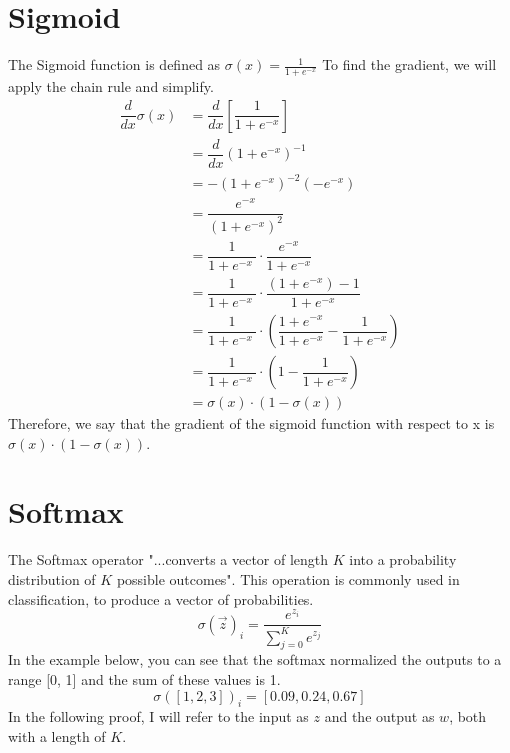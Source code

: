 \documentclass{report}
\begin{document}
        \section{Sigmoid}
            The Sigmoid function is defined as $\sigma(x) = \frac{1}{1+e^{-x}}$ To find the gradient, we will apply the chain rule and simplify.
            \begin{align}
                \dfrac{d}{dx} \sigma(x) &= \dfrac{d}{dx} \left[ \dfrac{1}{1 + e^{-x}} \right]\\
                &= \dfrac{d}{dx} \left( 1 + \mathrm{e}^{-x} \right)^{-1} \\
                &= -(1 + e^{-x})^{-2}(-e^{-x}) \\
                &= \dfrac{e^{-x}}{\left(1 + e^{-x}\right)^2} \\
                &= \dfrac{1}{1 + e^{-x}\ } \cdot \dfrac{e^{-x}}{1 + e^{-x}}  \\
                &= \dfrac{1}{1 + e^{-x}\ } \cdot \dfrac{(1 + e^{-x}) - 1}{1 + e^{-x}}  \\
                &= \dfrac{1}{1 + e^{-x}\ } \cdot \left( \dfrac{1 + e^{-x}}{1 + e^{-x}} - \dfrac{1}{1 + e^{-x}} \right) \\
                &= \dfrac{1}{1 + e^{-x}\ } \cdot \left( 1 - \dfrac{1}{1 + e^{-x}} \right) \\
                &= \sigma(x) \cdot (1 - \sigma(x))
            \end{align}
            Therefore, we say that the gradient of the sigmoid function with respect to x is $\sigma(x) \cdot (1-\sigma(x))$.

        \section{Softmax}
            The Softmax operator "...converts a vector of length $K$ into a probability distribution of $K$ possible outcomes".\cite{wiki:Softmax_function} This operation
            is commonly used in classification, to produce a vector of probabilities. 
            $$\sigma(\overrightarrow{z})_i = \frac{e^{z_i}}{\sum_{j=0}^{K}e^{z_j}}$$
            In the example below, you can see that the softmax normalized the outputs to a range [0, 1] and the sum of these values is 1.  
            $$\sigma([1, 2, 3])_i = [0.09, 0.24, 0.67]$$
            In the following proof, I will refer to the input as $z$ and the output as $w$, both with a length of $K$. 
\end{document}
